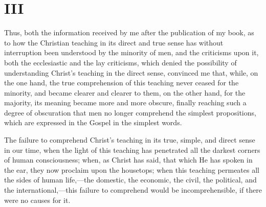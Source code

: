 \documentclass{book}
\begin{document}
\chapter*{III}
\label{chapter-3}
Thus, both the information received by me after the publication of my book, as to how the Christian teaching in its direct and true sense has without interruption been understood by the minority of men, and the criticisms upon it, both the ecclesiastic and the lay criticisms, which denied the possibility of understanding Christ’s teaching in the direct sense, convinced me that, while, on the one hand, the true comprehension of this teaching never ceased for the minority, and became clearer and clearer to them, on the other hand, for the majority, its meaning became more and more obscure, finally reaching such a degree of obscuration that men no longer comprehend the simplest propositions, which are expressed in the Gospel in the simplest words.

The failure to comprehend Christ’s teaching in its true, simple, and direct sense in our time, when the light of this teaching has penetrated all the darkest corners of human consciousness; when, as Christ has said, that which He has spoken in the ear, they now proclaim upon the housetops; when this teaching permeates all the sides of human life,—the domestic, the economic, the civil, the political, and the international,—this failure to comprehend would be incomprehensible, if there were no causes for it.
\end{document}
